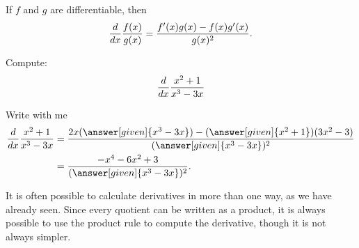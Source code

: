 \documentclass{ximera}
\begin{document}
\begin{theorem}\label{theorem:quotient-rule}
If $f$ and $g$ are differentiable, then
\[
\frac{d}{\mathop{}\!d x} \frac{f(x)}{g(x)} = \frac{f'(x)g(x)-f(x)g'(x)}{g(x)^2}.
\]
\end{theorem}



\begin{example}
Compute:
\[
\frac{d}{\mathop{}\!d x} \frac{x^2+1}{x^3-3x}
\]

\begin{explanation}
Write with me
\begin{align*}
\ddx \frac{x^2+1}{x^3-3x} &= \frac{2x(\answer[given]{x^3-3x})-(\answer[given]{x^2+1})(3x^2-3)}{(\answer[given]{x^3-3x})^2}\\
&=\frac{-x^4-6x^2+3}{(\answer[given]{x^3-3x})^2}.
\end{align*}
\end{explanation}
\end{example}

It is often possible to calculate derivatives in more than one way, as
we have already seen. Since every quotient can be written as a
product, it is always possible to use the product rule to compute the
derivative, though it is not always simpler.
\end{document}
